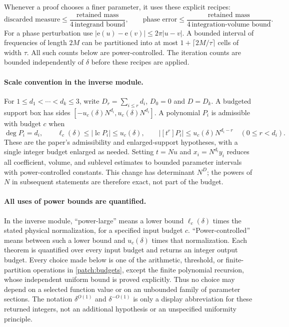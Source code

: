 \documentclass[11pt]{article}
\theoremstyle{definition}
\newcommand{\ee}[1]{\mathrm e\!\left(#1\right)}
\begin{document}
Whenever a proof chooses a finer parameter, it uses these explicit recipes:
\[
 \text{discarded measure}\leq\frac{\text{retained mass}}{4\,\text{integrand bound}},
 \qquad
 \text{phase error}\leq\frac{\text{retained mass}}{4\,\text{integration-volume bound}}.
\]
For a phase perturbation use $|\ee u-\ee v|\leq2\pi|u-v|$.
A bounded interval of frequencies of length $2M$ can be partitioned into at most
$1+\lceil2M/\tau\rceil$ cells of width $\tau$.  All such counts below are power-controlled.
The iteration counts are bounded independently of $\delta$ before these recipes are applied.

\paragraph{Scale convention in the inverse module.}
For $1\leq d_1<\cdots<d_k\leq3$, write $D_r=\sum_{i\leq r}d_i$, $D_0=0$ and $D=D_k$.
A budgeted support box has sides $[-u_c(\delta)N^{d_i},u_c(\delta)N^{d_i}]$.
A polynomial $P_i$ is admissible with budget $c$ when
\[
 \deg P_i=d_i,\qquad
 \ell_c(\delta)\leq|\operatorname{lc}P_i|\leq u_c(\delta),\qquad
 |[t^r]P_i|\leq u_c(\delta)N^{d_i-r}\quad(0\leq r<d_i).
\]
These are the paper's admissibility and enlarged-support hypotheses, with a single integer
budget enlarged as needed.  Setting $t=Nu$ and $x_i=N^{d_i}y_i$ reduces all coefficient,
volume, and sublevel estimates to bounded parameter intervals with power-controlled
constants.  This change has determinant $N^D$; the powers of $N$ in subsequent statements
are therefore exact, not part of the budget.



\paragraph{All uses of power bounds are quantified.}
In the inverse module, ``power-large'' means a lower bound $\ell_c(\delta)$ times the
stated physical normalization, for a specified input budget $c$. ``Power-controlled'' means
between such a lower bound and $u_c(\delta)$ times that normalization. Each theorem is
quantified over every input budget and returns an integer output budget. Every choice made
below is one of the arithmetic, threshold, or finite-partition operations in
\cref{patch:budgets}, except the finite polynomial recursion, whose independent uniform
bound is proved explicitly. Thus no choice may depend on a selected function value or on
an unbounded family of parameter sections. The notation $\delta^{O(1)}$ and
$\delta^{-O(1)}$ is only a display abbreviation for these returned integers, not an
additional hypothesis or an unspecified uniformity principle.
\end{document}
